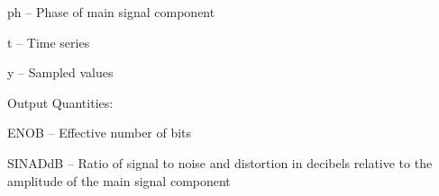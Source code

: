 \begin{tightdesc}
\begin{tightdesc}
\begin{tightdesc}
            \item[\textsf{ph}] -- Phase of main signal component
            \item[\textsf{t}] -- Time series
            \item[\textsf{y}] -- Sampled values
        \end{tightdesc}
    \end{tightdesc}
\item [Output Quantities:] \rule{0em}{0em}
    \begin{tightdesc}
        \item[\textsf{ENOB}] -- Effective number of bits
        \item[\textsf{SINADdB}] -- Ratio of signal to noise and distortion in decibels relative to the amplitude of the main signal component
    \end{tightdesc}
\end{tightdesc}
